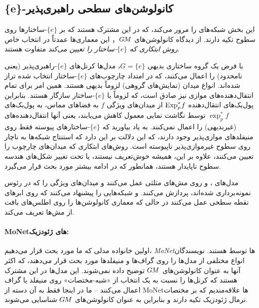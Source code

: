 

\subsection{\{e\}-کانولوشن‌های سطحی راهبری‌پذیر}
\label{sec:e_surface_conv}


این بخش شبکه‌های \cite{monti2017geometric,jin2018learning,schonsheck2018parallel,tatarchenko2018tangent,jin2019NPTCnet,li2019crossAtlas} را مرور می‌کند،
که در این مشترک هستند که بر $\{e\}$-ساختارها روی سطوح تکیه دارند.
از دیدگاه کانولوشن‌های $G\mkern-1.4muM$， این معماری‌ها عمدتاً در انتخاب خاص \emph{روش ابتکاری که $\{e\}$-ساختار را تعیین می‌کند} متفاوت هستند.


با فرض یک گروه ساختاری بدیهی $G=\{e\}$، مدل‌ها کرنل‌های $\{e\}$-راهبری‌پذیر (یعنی نامحدود) را اعمال می‌کنند، که در امتداد چارچوب‌های $\{e\}$-ساختار انتخاب شده تراز شده‌اند.
انواع میدان (نمایش‌های گروهی) لزوماً بدیهی هستند.
همین امر برای تمام انتقال‌دهنده‌های موازی نیز صادق است، که لزوماً با $\{e\}$-ساختار سازگار هستند.
بنابراین پول‌بک‌های انتقال‌دهنده $\operatorname{Exp}^*_p\mkern-2mu f$ از میدان‌های ویژگی $f$ به فضاهای مماس، به پول‌بک‌های $\exp_p^*f$ توسط نگاشت نمایی معمول کاهش می‌یابند، یعنی آنها انتقال‌دهنده‌های (غیربدیهی) را اعمال نمی‌کنند.
به یاد بیاورید که $\{e\}$-ساختارهای پیوسته فقط روی منیفلدهای موازی‌پذیر وجود دارند، که این دلالت بر این دارد که استنتاج شبکه‌ها به ناچار روی سطوح غیرموازی‌پذیر ناپیوسته است.
روش‌های ابتکاری که میدان‌های چارچوب را تعیین می‌کنند، علاوه بر این، همیشه خوش‌تعریف نیستند، یا تحت تغییر شکل‌های هندسه سطوح ناپایدار هستند، همانطور که در ادامه بیشتر مورد بحث قرار می‌گیرد.

مدل‌های \citet{monti2017geometric}، \citet{jin2018learning} و \citet{schonsheck2018parallel} روی مش‌های مثلثی عمل می‌کنند و میدان‌های ویژگی را که در رئوس نمونه‌برداری شده‌اند، پردازش می‌کنند.
\citet{tatarchenko2018tangent} و \citet{jin2019NPTCnet} شبکه‌هایی را پیشنهاد می‌کنند که روی ابرهای نقطه سطحی عمل می‌کنند در حالی که معماری \citet{li2019crossAtlas} کانولوشن‌ها را روی اطلس‌های بافت از مش‌ها تعریف می‌کند.





\paragraph{MoNetهای ژئودزیک:}
اولین خانواده مدلی که ما مورد بحث قرار می‌دهیم، \emph{MoNet}ها توسط \citet{monti2017geometric} هستند.
نویسندگان انواع مختلفی از مدل‌ها را روی گراف‌ها و منیفلدها مورد بحث قرار می‌دهند، که اکثر آنها به عنوان کانولوشن‌های $G\mkern-1.4muM$ توضیح داده نمی‌شوند.
این مدل‌ها در این مشترک هستند که کرنل‌ها را نسبت به یک انتخاب از «شبه-مختصات» روی منیفلد یا گراف اعمال می‌کنند
-- ما در اینجا فقط به آن دسته از MoNetها علاقه‌مندیم که بر مختصات نرمال ژئودزیک تکیه دارند و بنابراین به عنوان کانولوشن‌های $G\mkern-1.4muM$ شناسایی می‌شوند.

